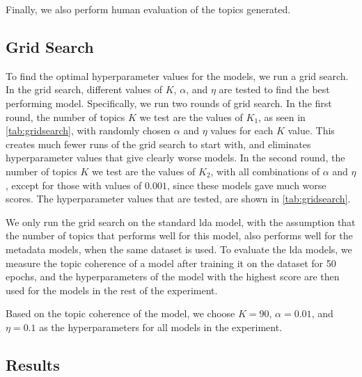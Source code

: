 Finally, we also perform human evaluation of the topics generated.

\subsection{Grid Search}\label{sec:experiment_gridsearch}
To find the optimal hyperparameter values for the models, we run a grid search.
In the grid search, different values of $K$, $\alpha$, and $\eta$ are tested to find the best performing model.
Specifically, we run two rounds of grid search.
In the first round, the number of topics $K$ we test are the values of $K_1$, as seen in \autoref{tab:gridsearch}, with randomly chosen $\alpha$ and $\eta$ values for each $K$ value.
This creates much fewer runs of the grid search to start with, and eliminates hyperparameter values that give clearly worse models.
In the second round, the number of topics $K$ we test are the values of $K_2$, with all combinations of $\alpha$ and $\eta$, except for those with values of $0.001$, since these models gave much worse scores.
The hyperparameter values that are tested, are shown in \autoref{tab:gridsearch}.

We only run the grid search on the standard \gls{lda} model, with the assumption that the number of topics that performs well for this model, also performs well for the metadata models, when the same dataset is used.
To evaluate the \gls{lda} models, we measure the topic coherence of a model after training it on the dataset for 50 epochs, and the hyperparameters of the model with the highest score are then used for the models in the rest of the experiment.

Based on the topic coherence of the model, we choose $K = 90$, $\alpha = 0.01$, and $\eta = 0.1$ as the hyperparameters for all models in the experiment.



\subsection{Results}\label{sec:results}


